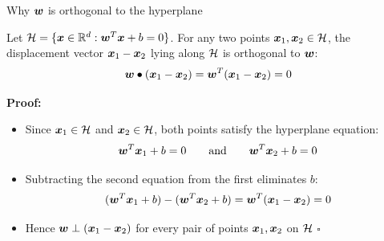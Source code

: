 \documentclass[aspectratio=169]{beamer}\usepackage[]{graphicx}\usepackage[]{xcolor}
\begin{document}
\begin{frame}[red]{Why $\bm{w}$ is orthogonal to the hyperplane}
    \begin{proposition}
        Let $\mathcal{H} = \{\bm{x} \in \mathbb{R}^d : \bm{w}^T \bm{x} + b = 0\}$. For any two points $\bm{x}_1, \bm{x}_2 \in \mathcal{H}$, the displacement vector $\bm{x}_1 - \bm{x}_2$ lying along $\mathcal{H}$ is orthogonal to $\bm{w}$:
        \[
            \bm{w} \bullet (\bm{x}_1 - \bm{x}_2) = \bm{w}^T(\bm{x}_1 - \bm{x}_2) = 0
        \]
    \end{proposition}
    \vfill
    \textbf{Proof:}
    \begin{itemize}
        \item Since $\bm{x}_1 \in \mathcal{H}$ and $\bm{x}_2 \in \mathcal{H}$, both points satisfy the hyperplane equation:
        \[
            \bm{w}^T \bm{x}_1 + b = 0 \qquad \text{and} \qquad \bm{w}^T \bm{x}_2 + b = 0
        \]
        \item Subtracting the second equation from the first eliminates $b$:
        \[
            (\bm{w}^T \bm{x}_1 + b) - (\bm{w}^T \bm{x}_2 + b) = \bm{w}^T(\bm{x}_1 - \bm{x}_2) = 0
        \]
        \item Hence $\bm{w} \perp (\bm{x}_1 - \bm{x}_2)$ for every pair of points $\bm{x}_1, \bm{x}_2$ on $\mathcal{H}$ \hfill $\square$
    \end{itemize}
\end{frame}
\end{document}
